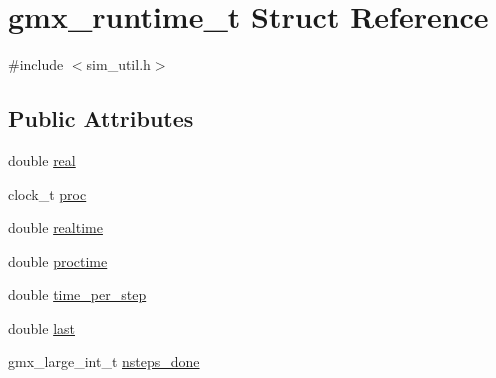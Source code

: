 \hypertarget{structgmx__runtime__t}{\section{gmx\-\_\-runtime\-\_\-t \-Struct \-Reference}
\label{structgmx__runtime__t}
}


{\ttfamily \#include $<$sim\-\_\-util.\-h$>$}

\subsection*{\-Public \-Attributes}
\begin{DoxyCompactItemize}
\item 
double \hyperlink{structgmx__runtime__t_a85e2ed5abe29010507001fc87ab8ada4}{real}
\item 
clock\-\_\-t \hyperlink{structgmx__runtime__t_aa672da784c35075c08a5a32f3383d88c}{proc}
\item 
double \hyperlink{structgmx__runtime__t_a082ae54813da58b728f7fdc375dca17c}{realtime}
\item 
double \hyperlink{structgmx__runtime__t_a6a810c82e3520e1eb3f9b450b1560804}{proctime}
\item 
double \hyperlink{structgmx__runtime__t_a695d4ed072d42593e9415f0b46983639}{time\-\_\-per\-\_\-step}
\item 
double \hyperlink{structgmx__runtime__t_aa8821854ff9dd19f021311f217d770da}{last}
\item 
gmx\-\_\-large\-\_\-int\-\_\-t \hyperlink{structgmx__runtime__t_a3eb381d017ad8882627ee81924136574}{nsteps\-\_\-done}
\end{DoxyCompactItemize}


